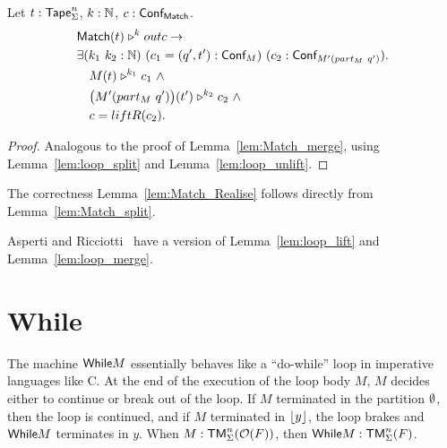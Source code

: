 \begin{lemma}
  \label{lem:Match_split}
  Let $t : \textsf{Tape}_\Sigma^n$, $k : \mathbb{N}$, $c : \textsf{Conf}_{\textsf{Match}}$.
  \begin{align*}
    & \textsf{Match}(t) \mathrel{\triangleright}^k outc \rightarrow \\
    & \exists (k_1~k_2 : \mathbb{N})~(c_1 = (q', t') : \textsf{Conf}_M)~(c_2 : \textsf{Conf}_{M'(part_M~q')}). \\
    & \quad M(t) \mathrel{\triangleright}^{k_1} c_1 ~\land~ \\
    & \quad \bigl( M' (part_M~q') \bigr) (t') \mathrel{\triangleright}^{k_2} c_2 ~\land~ \\
    & \quad c = liftR(c_2).
  \end{align*}
\end{lemma}
\begin{proof}
  Analogous to the proof of Lemma~\ref{lem:Match_merge}, using Lemma~\ref{lem:loop_split} and Lemma~\ref{lem:loop_unlift}.
\end{proof}
The correctness Lemma~\ref{lem:Match_Realise} follows directly from Lemma~\ref{lem:Match_split}.


Asperti and Ricciotti~\cite{asperti2015} have a version of Lemma~\ref{lem:loop_lift} and Lemma~\ref{lem:loop_merge}.

\section{While}
\label{sec:While}


The machine $\textsf{While} M$ essentially behaves like a ``do-while'' loop in imperative languages like C.  At the end of the execution of the loop body $M$,
$M$ decides either to continue or break out of the loop.  If $M$ terminated in the partition $\emptyset$, then the loop is continued, and if $M$ terminated
in $\left\lfloor {y} \right\rfloor$, the loop brakes and $\textsf{While} M$ terminates in $y$.  When $M : \textsf{TM}_\Sigma^n(\mathcal{O}(F))$, then $\textsf{While} M : \textsf{TM}_\Sigma^n(F)$.


